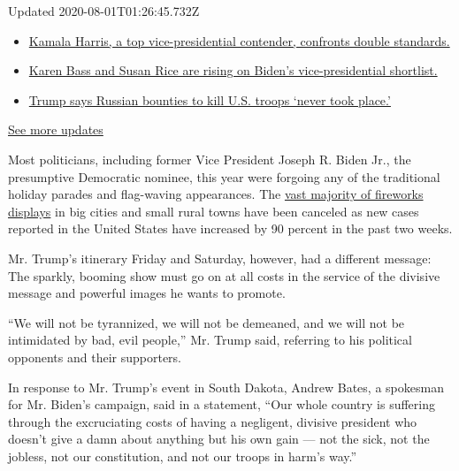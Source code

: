 Updated 2020-08-01T01:26:45.732Z

\begin{itemize}
\tightlist
\item
  \href{https://www.nytimes.com/2020/07/31/us/elections/biden-vs-trump.html?action=click\&pgtype=Article\&state=default\&region=MAIN_CONTENT_1\&context=storylines_live_updates\#link-29fdff45}{Kamala
  Harris, a top vice-presidential contender, confronts double
  standards.}
\item
  \href{https://www.nytimes.com/2020/07/31/us/elections/biden-vs-trump.html?action=click\&pgtype=Article\&state=default\&region=MAIN_CONTENT_1\&context=storylines_live_updates\#link-13ec3d9c}{Karen
  Bass and Susan Rice are rising on Biden's vice-presidential
  shortlist.}
\item
  \href{https://www.nytimes.com/2020/07/31/us/elections/biden-vs-trump.html?action=click\&pgtype=Article\&state=default\&region=MAIN_CONTENT_1\&context=storylines_live_updates\#link-49e9a016}{Trump
  says Russian bounties to kill U.S. troops `never took place.'}
\end{itemize}

\href{https://www.nytimes.com/2020/07/31/us/elections/biden-vs-trump.html?action=click\&pgtype=Article\&state=default\&region=MAIN_CONTENT_1\&context=storylines_live_updates}{See
more updates}

Most politicians, including former Vice President Joseph R. Biden Jr.,
the presumptive Democratic nominee, this year were forgoing any of the
traditional holiday parades and flag-waving appearances. The
\href{https://www.nytimes.com/2020/07/01/business/fourth-of-july-fireworks-displays.html}{vast
majority of fireworks displays} in big cities and small rural towns have
been canceled as new cases reported in the United States have increased
by 90 percent in the past two weeks.

Mr. Trump's itinerary Friday and Saturday, however, had a different
message: The sparkly, booming show must go on at all costs in the
service of the divisive message and powerful images he wants to promote.

``We will not be tyrannized, we will not be demeaned, and we will not be
intimidated by bad, evil people,'' Mr. Trump said, referring to his
political opponents and their supporters.

In response to Mr. Trump's event in South Dakota, Andrew Bates, a
spokesman for Mr. Biden's campaign, said in a statement, ``Our whole
country is suffering through the excruciating costs of having a
negligent, divisive president who doesn't give a damn about anything but
his own gain --- not the sick, not the jobless, not our constitution,
and not our troops in harm's way.''

